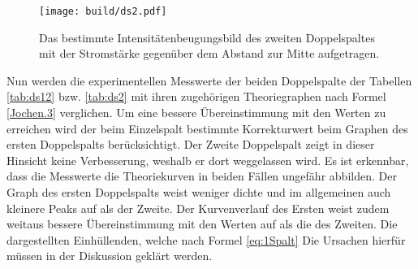 \begin{figure}
 \centering
 \caption{Das bestimmte Intensitätenbeugungsbild des zweiten Doppelspaltes mit der Stromstärke gegenüber dem Abstand zur Mitte aufgetragen.}
 \texttt{[image: build/ds2.pdf]}
 \label{fig:dszwei}
\end{figure}
Nun werden die experimentellen Messwerte der beiden Doppelspalte der Tabellen \ref{tab:ds12} bzw. \ref{tab:ds2} mit ihren zugehörigen Theoriegraphen nach Formel \eqref{Jochen.3} verglichen.
Um eine bessere Übereinstimmung mit den Werten zu erreichen wird der beim Einzelspalt bestimmte Korrekturwert beim Graphen des ersten Doppelspalts berücksichtigt.
Der Zweite Doppelspalt zeigt in dieser Hinsicht keine Verbesserung, weshalb er dort weggelassen wird.
Es ist erkennbar, dass die Messwerte die Theoriekurven in beiden Fällen ungefähr abbilden. Der Graph des ersten Doppelspalts weist weniger
 dichte und im allgemeinen auch kleinere Peaks auf als der Zweite.
Der Kurvenverlauf des Ersten weist zudem weitaus bessere Übereinstimmung mit den Werten auf als die des Zweiten. Die dargestellten Einhüllenden,
welche nach Formel \eqref{eq:1Spalt}
Die Ursachen hierfür müssen in der Diskussion geklärt werden.
